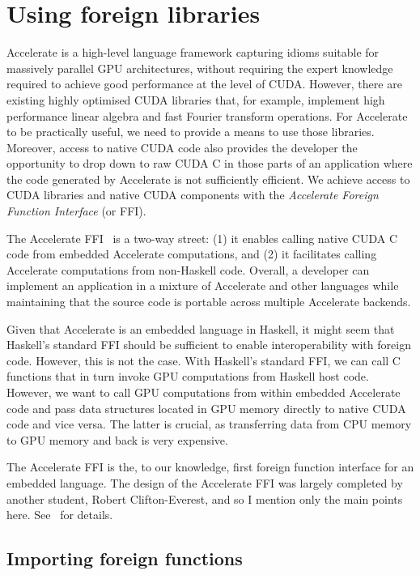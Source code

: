 \section{Using foreign libraries}
\label{sec:ffi}

Accelerate is a high-level language framework capturing idioms suitable for
massively parallel GPU architectures, without requiring the expert knowledge
required to achieve good performance at the level of CUDA\@. However, there are
existing highly optimised CUDA libraries that, for example, implement high
performance linear algebra and fast Fourier transform operations. For Accelerate
to be practically useful, we need to provide a means to use those libraries.
Moreover, access to native CUDA code also provides the developer the opportunity
to drop down to raw CUDA C in those parts of an application where the code
generated by Accelerate is not sufficiently efficient. We achieve access to CUDA
libraries and native CUDA components with the \emph{Accelerate Foreign Function
Interface} (or FFI).

The Accelerate FFI~\cite{CliftonEverest:2014vi} is a two-way street: (1) it
enables calling native CUDA C code from embedded Accelerate computations, and
(2) it facilitates calling Accelerate computations from non-Haskell code.
Overall, a developer can implement an application in a mixture of Accelerate and
other languages while maintaining that the source code is portable across
multiple Accelerate backends.

Given that Accelerate is an embedded language in Haskell, it might seem that
Haskell's standard FFI should be sufficient to enable interoperability
with foreign code. However, this is not the case. With Haskell's standard FFI,
we can call C functions that in turn invoke GPU computations from Haskell host
code. However, we want to call GPU computations from within embedded Accelerate
code and pass data structures located in GPU memory directly to native CUDA code
and vice versa. The latter is crucial, as transferring data from CPU memory to
GPU memory and back is very expensive.

The Accelerate FFI is the, to our knowledge, first foreign function interface
for an embedded language. The design of the Accelerate FFI was largely
completed by another student, Robert Clifton-Everest, and so I mention only the
main points here. See~\cite{CliftonEverest:2014vi} for details.

\subsection{Importing foreign functions}

